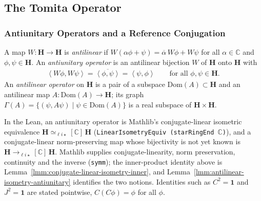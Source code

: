 \subsection{The Tomita Operator}\label{sbsctn:tomita-operator}

\subsubsection{Antiunitary Operators and a Reference Conjugation}

\begin{definition}
    \label{def:antiunitary-operator}
    \leanok
    A map $W : \mathbf{H} \to \mathbf{H}$ is \emph{antilinear} if $W(\alpha\phi + \psi) = \overline{\alpha}\, W\phi + W\psi$ for all $\alpha \in \mathbb{C}$ and $\phi, \psi \in \mathbf{H}$. An \emph{antiunitary operator} is an antilinear bijection $W$ of $\mathbf{H}$ onto $\mathbf{H}$ with
    \begin{align}
        \left< W\phi, W\psi \right> = \overline{\left< \phi, \psi \right>} = \left< \psi, \phi \right> \qquad \text{for all } \phi, \psi \in \mathbf{H}.
    \end{align}
    An \emph{antilinear operator} on $\mathbf{H}$ is a pair of a subspace $\text{Dom}(A) \subset \mathbf{H}$ and an antilinear map $A : \text{Dom}(A) \to \mathbf{H}$; its graph $\Gamma(A) = \{ (\psi, A\psi) \mid \psi \in \text{Dom}(A) \}$ is a real subspace of $\mathbf{H} \times \mathbf{H}$.

    In the Lean, an antiunitary operator is Mathlib's conjugate-linear isometric equivalence $\mathbf{H} \simeq_{\ell i \star}[\mathbb{C}]\, \mathbf{H}$ (\texttt{LinearIsometryEquiv (starRingEnd \ensuremath{\mathbb{C}})}), and a conjugate-linear norm-preserving map whose bijectivity is not yet known is $\mathbf{H} \to_{\ell i \star}[\mathbb{C}]\, \mathbf{H}$. Mathlib supplies conjugate-linearity, norm preservation, continuity and the inverse (\texttt{symm}); the inner-product identity above is Lemma~\ref{lmm:conjugate-linear-isometry-inner}, and Lemma~\ref{lmm:antilinear-isometry-antiunitary} identifies the two notions. Identities such as $C^2 = \mathbf{1}$ and $J^2 = \mathbf{1}$ are stated pointwise, $C(C\phi) = \phi$ for all $\phi$.
\end{definition}

